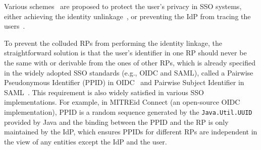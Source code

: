 



Various schemes~\cite{SAMLIdentifier,OpenIDConnect,persona,SPRESSO} are proposed to protect the user's privacy in SSO systems, either achieving the identity unlinkage~\cite{SAMLIdentifier,OpenIDConnect}, or preventing the IdP from tracing the users~\cite{persona,SPRESSO}.

To prevent the colluded RPs from performing the identity linkage, the straightforward solution is that the user's identifier in one RP should never be the same with or derivable from the ones of other RPs, which is already specified in the widely adopted SSO standards (e.g., OIDC and SAML), called a Pairwise Pseudonymous Identifier (PPID) in OIDC~\cite{OpenIDConnect} and Pairwise Subject Identifier in SAML~\cite{SAMLIdentifier}. This requirement is also widely satisfied in various SSO implementations. For example, in MITREid Connect (an open-source OIDC implementation), PPID is a random sequence generated by the \verb+Java.Util.UUID+ provided by Java and the binding between the PPID and the RP is only maintained by the IdP, which ensures PPIDs for different RPs are independent in the view of any entities except the IdP and the user.


